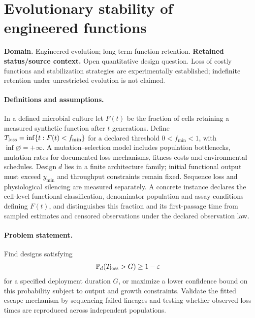 \documentclass[11pt]{article}
\begin{document}
\section*{Evolutionary stability of engineered functions}
\label{prob:264}
\label{rank:110}
\par\smallskip

\noindent\textbf{Domain.} Engineered evolution; long-term function retention. \quad \textbf{Retained status/source context.} Open quantitative design question. Loss of costly functions and stabilization strategies are experimentally established; indefinite retention under unrestricted evolution is not claimed.

\paragraph{Definitions and assumptions.} In a defined microbial culture let $F(t)$ be the fraction of cells retaining a measured synthetic function after $t$ generations. Define $T_{\rm loss}=\inf\{t:F(t)<f_{\min}\}$ for a declared threshold $0<f_{\min}<1$, with $\inf\varnothing=+\infty$. A mutation--selection model includes population bottlenecks, mutation rates for documented loss mechanisms, fitness costs and environmental schedules. Design $d$ lies in a finite architecture family; initial functional output must exceed $y_{\min}$ and throughput constraints remain fixed. Sequence loss and physiological silencing are measured separately. A concrete instance declares the cell-level functional classification, denominator population and assay conditions defining $F(t)$, and distinguishes this fraction and its first-passage time from sampled estimates and censored observations under the declared observation law.

\paragraph{Problem statement.} Find designs satisfying
\[
\mathbb{P}_d(T_{\rm loss}>G)\geq1-\varepsilon
\]
for a specified deployment duration $G$, or maximize a lower confidence bound on this probability subject to output and growth constraints. Validate the fitted escape mechanism by sequencing failed lineages and testing whether observed loss times are reproduced across independent populations.
\end{document}
